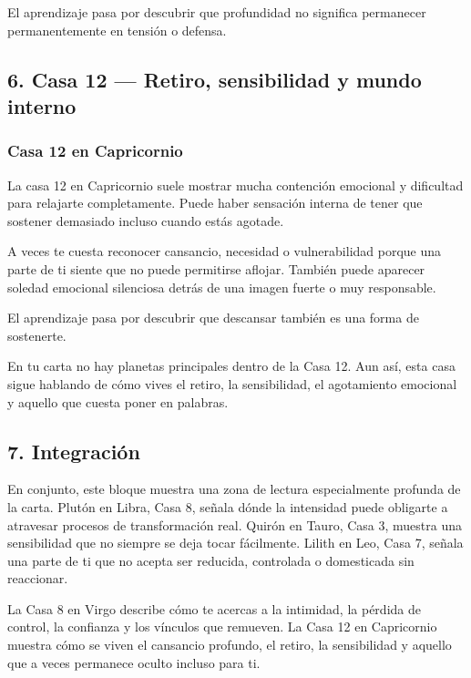 \documentclass[11pt,a4paper]{article}
\begin{document}
El aprendizaje pasa por descubrir que profundidad no significa permanecer permanentemente en tensión o defensa.

\vspace{0.8cm}

\subsection{6. Casa 12 — Retiro, sensibilidad y mundo interno}

\subsubsection*{Casa 12 en Capricornio}

La casa 12 en Capricornio suele mostrar mucha contención emocional y dificultad para relajarte completamente. Puede haber sensación interna de tener que sostener demasiado incluso cuando estás agotade.

A veces te cuesta reconocer cansancio, necesidad o vulnerabilidad porque una parte de ti siente que no puede permitirse aflojar. También puede aparecer soledad emocional silenciosa detrás de una imagen fuerte o muy responsable.

El aprendizaje pasa por descubrir que descansar también es una forma de sostenerte.

En tu carta no hay planetas principales dentro de la Casa 12. Aun así, esta casa sigue hablando de cómo vives el retiro, la sensibilidad, el agotamiento emocional y aquello que cuesta poner en palabras.

\vspace{0.8cm}

\subsection{7. Integración}

En conjunto, este bloque muestra una zona de lectura especialmente profunda de la carta. Plutón en Libra, Casa 8, señala dónde la intensidad puede obligarte a atravesar procesos de transformación real. Quirón en Tauro, Casa 3, muestra una sensibilidad que no siempre se deja tocar fácilmente. Lilith en Leo, Casa 7, señala una parte de ti que no acepta ser reducida, controlada o domesticada sin reaccionar.

La Casa 8 en Virgo describe cómo te acercas a la intimidad, la pérdida de control, la confianza y los vínculos que remueven. La Casa 12 en Capricornio muestra cómo se viven el cansancio profundo, el retiro, la sensibilidad y aquello que a veces permanece oculto incluso para ti.
\end{document}
